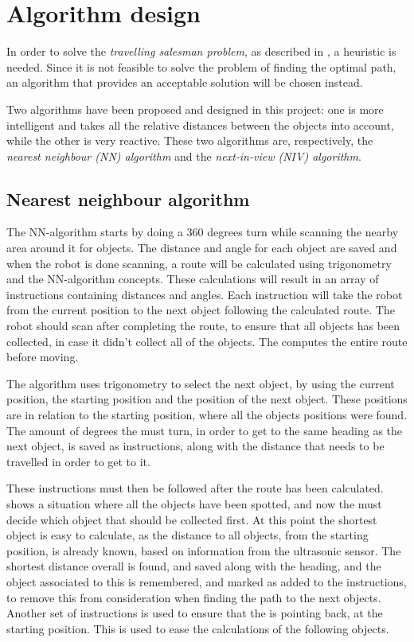 \section{Algorithm design} \label{sec:algorithm-design}

In order to solve the \emph{travelling salesman problem}, as described in , a heuristic is needed. Since it is not feasible to solve the problem of finding the optimal path, an algorithm that provides an acceptable solution will be chosen instead.

Two algorithms have been proposed and designed in this project: one is more intelligent and takes all the relative distances between the objects into account, while the other is very reactive. These two algorithms are, respectively, the \emph{nearest neighbour (NN) algorithm} and the \emph{next-in-view (NIV) algorithm}.


\subsection{Nearest neighbour algorithm} \label{sec:nn-algorithm}
The NN-algorithm starts by doing a 360 degrees turn while scanning the nearby area around it for objects. The distance and angle for each object are saved and when the robot is done scanning, a route will be calculated using trigonometry and the NN-algorithm concepts. These calculations will result in an array of instructions containing distances and angles. Each instruction will take the robot from the current position to the next object following the calculated route. The robot should scan after completing the route, to ensure that all objects has been collected, in case it didn't collect all of the objects. The \projname{} computes the entire route before moving.

The algorithm uses trigonometry to select the next object, by using the current position, the starting position and the position of the next object. These positions are in relation to the starting position, where all the objects positions were found. The amount of degrees the \projname{} must turn, in order to get to the same heading as the next object, is saved as instructions, along with the distance that needs to be travelled in order to get to it. 

These instructions must then be followed after the route has been calculated.  shows a situation where all the objects have been spotted, and now the \projname{} must decide which object that should be collected first. At this point the shortest object is easy to calculate, as the distance to all objects, from the starting position, is already known, based on information from the ultrasonic sensor. The shortest distance overall is found, and saved along with the heading, and the object associated to this is remembered, and marked as added to the instructions, to remove this from consideration when finding the path to the next objects. Another set of instructions is used to ensure that the \projname{} is pointing back, at the starting position. This is used to ease the calculations of the following objects. 

